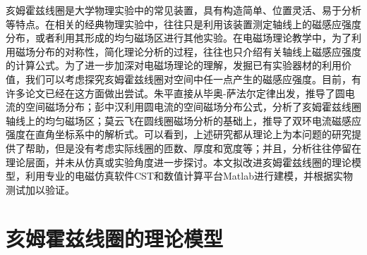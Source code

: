 \documentclass{ctexart}
\begin{document}
\begin{multicols}{2}
亥姆霍兹线圈是大学物理实验中的常见装置，具有构造简单、位置灵活、易于分析等特点。在相关的经典物理实验中，往往只是利用该装置测定轴线上的磁感应强度分布，或者利用其形成的均匀磁场区进行其他实验。在电磁场理论教学中，为了利用磁场分布的对称性，简化理论分析的过程，往往也只介绍有关轴线上磁感应强度的计算公式。为了进一步加深对电磁场理论的理解，发掘已有实验器材的利用价值，我们可以考虑探究亥姆霍兹线圈对空间中任一点产生的磁感应强度。目前，有许多论文已经在这方面做出尝试。朱平\cite{zhuping}直接从毕奥-萨法尔定律出发，推导了圆电流的空间磁场分布；彭中汉\cite{pengzhonghan}利用圆电流的空间磁场分布公式，分析了亥姆霍兹线圈轴线上的均匀磁场区；莫云飞\cite{moyunfei}在圆线圈磁场分析的基础上，推导了双环电流磁感应强度在直角坐标系中的解析式。可以看到，上述研究都从理论上为本问题的研究提供了帮助，但是没有考虑实际线圈的匝数、厚度和宽度等；并且，分析往往停留在理论层面，并未从仿真或实验角度进一步探讨。本文拟改进亥姆霍兹线圈的理论模型，利用专业的电磁仿真软件CST和数值计算平台Matlab进行建模，并根据实物测试加以验证。
\section{亥姆霍兹线圈的理论模型}

\end{multicols}
\end{document}
